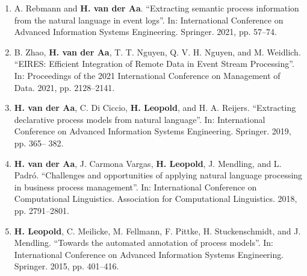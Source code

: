 \begin{enumerate}[resume,leftmargin=*]
\item 
 A. Rebmann and \textbf{H. van der Aa}. “Extracting semantic process information from the natural language in event logs”. In: International Conference on Advanced Information Systems Engineering. Springer. 2021, pp. 57–74.
 
 \item B. Zhao,\textbf{ H. van der Aa}, T. T. Nguyen, Q. V. H. Nguyen, and M. Weidlich. “EIRES: Efficient Integration of Remote Data in Event Stream Processing”. In: Proceedings of the 2021 International Conference on Management of Data. 2021, pp. 2128–2141.

\item \textbf{H. van der Aa}, C. Di Ciccio, \textbf{H. Leopold}, and H. A. Reijers. “Extracting declarative process models from natural language”. In: International Conference on Advanced Information Systems Engineering. Springer. 2019, pp. 365– 382.

\item 
\textbf{ H. van der Aa}, J. Carmona Vargas, \textbf{H. Leopold}, J. Mendling, and L. Padró. “Challenges and opportunities of applying natural language processing in business process management”. In: International Conference on Computational Linguistics. Association for Computational Linguistics. 2018, pp. 2791–2801.
\item \textbf{H. Leopold}, C. Meilicke, M. Fellmann, F. Pittke, H. Stuckenschmidt, and J. Mendling. “Towards the automated annotation of process models”. In: International Conference on Advanced Information Systems Engineering. Springer. 2015, pp. 401–416.
\end{enumerate}
\endgroup